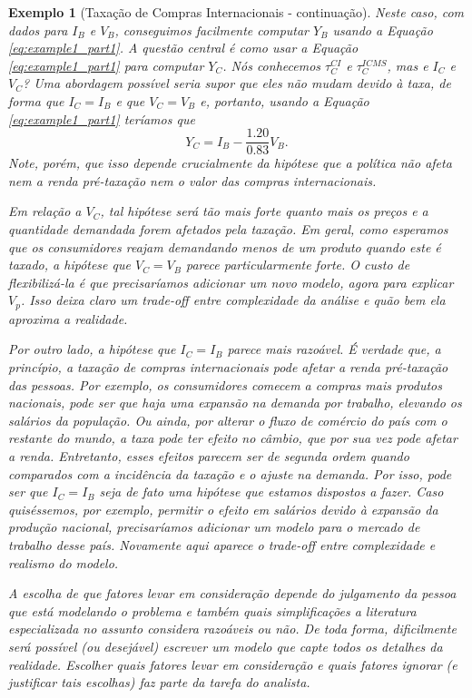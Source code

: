 \documentclass[12pt, a4paper, openany]{book}
\numberwithin{equation}{chapter}
\numberwithin{table}{chapter}
\numberwithin{figure}{chapter}
\theoremstyle{break}
\newtheorem{exemplo}{Exemplo}
\begin{document}
\begin{exemplo}[Taxação de Compras Internacionais - continuação]
Neste caso, com dados para $I_B$ e $V_B$, conseguimos facilmente computar $Y_B$ usando a Equação \eqref{eq:example1_part1}. A questão central é como usar a Equação \eqref{eq:example1_part1} para computar $Y_C$. Nós conhecemos $\tau^{CI}_C$ e $\tau^{ICMS}_C$, mas e $I_C$ e $V_C$? Uma abordagem possível seria supor que eles não mudam devido à taxa, de forma que $I_C=I_B$ e que $V_C=V_B$ e, portanto, usando a Equação \eqref{eq:example1_part1} teríamos que
\begin{equation}
\label{eq:determisitic_ci}
Y_C=I_B - \frac{1.20}{0.83}V_B.
\end{equation}
Note, porém, que isso depende crucialmente da hipótese que a política não afeta nem a renda pré-taxação nem o valor das compras internacionais. 

Em relação a $V_C$, tal hipótese será tão mais forte quanto mais  os preços e a quantidade demandada forem afetados pela taxação. Em geral, como esperamos que os consumidores reajam demandando menos de um produto quando este é taxado, a hipótese que $V_C=V_B$ parece particularmente forte. O custo de flexibilizá-la é que precisaríamos adicionar um novo modelo, agora para explicar $V_p$. Isso deixa claro um trade-off entre complexidade da análise e quão bem ela aproxima a realidade. 

Por outro lado, a hipótese que $I_C=I_B$ parece mais razoável. É verdade que, a princípio, a taxação de compras internacionais pode afetar a renda pré-taxação das pessoas. Por exemplo, os consumidores comecem a compras mais produtos nacionais, pode ser que haja uma expansão na demanda por trabalho, elevando os salários da população. Ou ainda, por alterar o fluxo de comércio do país com o restante do mundo, a taxa pode ter efeito no câmbio, que por sua vez pode afetar a renda. Entretanto, esses efeitos parecem ser de segunda ordem quando comparados com a incidência da taxação e o ajuste na demanda. Por isso, pode ser que $I_C=I_B$ seja de fato uma hipótese que estamos dispostos a fazer. Caso quiséssemos, por exemplo, permitir o efeito em salários devido à expansão da produção nacional, precisaríamos adicionar um modelo para o mercado de trabalho desse país. Novamente aqui aparece o trade-off entre complexidade e realismo do modelo.

A escolha de que fatores levar em consideração depende do julgamento da pessoa que está modelando o problema e também quais simplificações a literatura especializada no assunto considera razoáveis ou não. De toda forma, dificilmente será possível (ou desejável) escrever um modelo que capte todos os detalhes da realidade. Escolher quais fatores levar em consideração e quais fatores ignorar (e justificar tais escolhas) faz parte da tarefa do analista. 
\end{exemplo}
\end{document}
